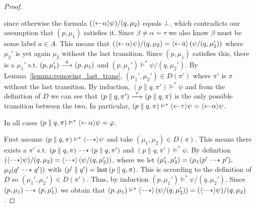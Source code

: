 \begin{proof}
\begin{itemize}
            since otherwise the formula $(\mbox{\ensuremath{\langle\leftarrow\! \alpha \rangle}}\psi)/(q,\mu_2)$
            equals $\bot$, which contradicts our assumption
            that $(p,\mu_1)$ satisfies it. Since $\beta\ne\alpha = \tau$ we also know $\beta$
            must be some label $a\in A$. This means that $(\mbox{\ensuremath{\langle\leftarrow\! \alpha \rangle}}\psi)/(q,\mu_2)
            = \mbox{\ensuremath{\langle\leftarrow\! \bar{a} \rangle}} \left( \psi / (q, \mu_2') \right)$ where $\mu_2'$ is yet
            again $\mu_2$ without the last transition. Since $(p,\mu_1)$ satisfies this,
            there is a $\mu_1'$ s.t. $(p,\mu_1')\ {\stackrel{{\bar{a}}}{\longrightarrow}}\ (p,\mu_1)$ and $(p,\mu_1')
            \vDash^* \psi/(q,\mu_2')$. By
            Lemma~\ref{lemma:removing_last_trans}, $(\mu_1',\mu_2')\in D(\pi')$ where
            $\pi'$ is $\pi$ without the last transition. By induction, $(p\parallel q, \pi')
            \vDash^* \psi$ and from the definition of $D$ we can see that $(p\parallel q,\pi')
            \ {\stackrel{{\tau}}{\longrightarrow}}\  (p\parallel q,\pi)$ is the only possible transition between the
            two. In particular,
            $(p\parallel q,\pi) \vDash^* \mbox{\ensuremath{\langle\leftarrow\! \tau \rangle}} \psi
            = \mbox{\ensuremath{\langle\leftarrow\! \alpha \rangle}}\psi$.
    \end{itemize}
    In all cases $(p\parallel q,\pi) \vDash^* \mbox{\ensuremath{\langle\leftarrow\! \alpha \rangle}}\psi = \varphi$.



    \par\nobreak
    \ltr First assume $(p\parallel q, \pi) \vDash^* \mbox{\ensuremath{\langle\stackrel{_{}}{\dashrightarrow}\rangle}}\psi$ and take $(\mu_1,\mu_2)
    \in D(\pi)$. This means there exists
    a $\pi'$ s.t. $(p\parallel q, \pi) \ {\stackrel{_{}}{\dashrightarrow}}\  (p\parallel q, \pi')$ and $(p\parallel q,
    \pi')\vDash^* \psi$. By definition
    $(\mbox{\ensuremath{\langle\stackrel{_{}}{\dashrightarrow}\rangle}}\psi)/(q,\mu_2) = \mbox{\ensuremath{\langle\stackrel{_{}}{\dashrightarrow}\rangle}} \left( \psi / (q, \mu_2') \right)$,
    where we let $(\mu_1',
    \mu_2') = (\mu_1(p'\ {\stackrel{_{}}{\dashrightarrow}}\ p'),$ $\mu_2(q'\ {\stackrel{_{}}{\dashrightarrow}}\ q'))$ with $(p' \parallel q') =
    \operatorname{last}{(p\parallel q, \pi)}$. This is according to the definition of $D$ so $(\mu_1',\mu_2')
    \in D(\pi')$. Thus, by induction $(p,\mu_1') \vDash^* \psi / (q,\mu_2')$. Since $(p,\mu_1)
    \ {\stackrel{_{}}{\dashrightarrow}}\  (p,\mu_1')$ we obtain that $(p,\mu_1) \vDash^* \mbox{\ensuremath{\langle\stackrel{_{}}{\dashrightarrow}\rangle}} \left(
    \psi / (q,\mu_2') \right) = (\mbox{\ensuremath{\langle\stackrel{_{}}{\dashrightarrow}\rangle}}\psi)/(q,\mu_2)$.


\end{proof}
